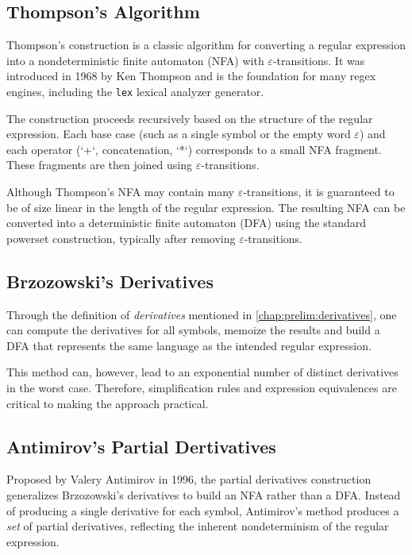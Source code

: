 
\subsection{Thompson's Algorithm}
Thompson's construction is a classic algorithm for converting a regular expression into a nondeterministic finite automaton (NFA) with $\varepsilon$-transitions. It was introduced in 1968 by Ken Thompson and is the foundation for many regex engines, including the \texttt{lex} lexical analyzer generator.

The construction proceeds recursively based on the structure of the regular expression. Each base case (such as a single symbol or the empty word $\varepsilon$) and each operator (`+`, concatenation, `*`) corresponds to a small NFA fragment. These fragments are then joined using $\varepsilon$-transitions.

Although Thompson's NFA may contain many $\varepsilon$-transitions, it is guaranteed to be of size linear in the length of the regular expression. The resulting NFA can be converted into a deterministic finite automaton (DFA) using the standard powerset construction, typically after removing $\varepsilon$-transitions.

\subsection{Brzozowski's Derivatives}
Through the definition of \emph{derivatives} mentioned in \ref{chap:prelim:derivatives}, one can compute the derivatives for all symbols, memoize the results and build a DFA that represents the same language as the intended regular expression.

This method can, however, lead to an exponential number of distinct derivatives in the worst case. Therefore, simplification rules and expression equivalences are critical to making the approach practical.

\subsection{Antimirov's Partial Dertivatives}
Proposed by Valery Antimirov in 1996, the partial derivatives construction generalizes Brzozowski's derivatives to build an NFA rather than a DFA. Instead of producing a single derivative for each symbol, Antimirov's method produces a \emph{set} of partial derivatives, reflecting the inherent nondeterminism of the regular expression.


